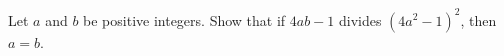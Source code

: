 Let $a$ and $b$ be positive integers.
Show that if $4ab - 1$ divides $(4a^{2} - 1)^{2}$, then $a = b$.